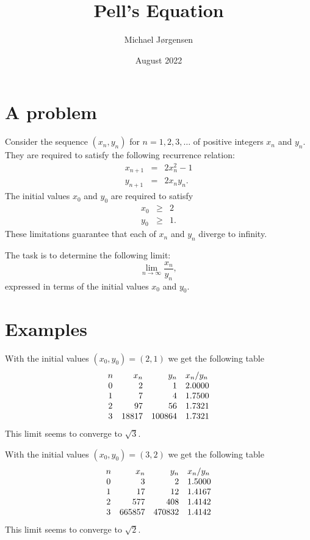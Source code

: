 \documentclass[12pt,oneside,a4paper]{article}
\title{Pell's Equation}
\date{August 2022}
\author{Michael Jørgensen}
\begin{document}
\maketitle

\section{A problem}

Consider the sequence $(x_n, y_n)$ for $n=1, 2, 3, \ldots$ of positive integers $x_n$ and $y_n$.
They are required to satisfy the following recurrence relation:
%
\begin{eqnarray*}
    x_{n+1} &=& 2 x_n^2 - 1 \\
    y_{n+1} &=& 2 x_n y_n.
\end{eqnarray*}
%
The initial values $x_0$ and $y_0$ are required to satisfy
%
\begin{eqnarray*}
    x_0 &\ge& 2 \\
    y_0 &\ge& 1.
\end{eqnarray*}
%
These limitations guarantee that each of $x_n$ and $y_n$ diverge to infinity.

The task is to determine the following limit:
%
\begin{equation*}
    \lim_{n \rightarrow \infty} \frac{x_n}{y_n},
\end{equation*}
%
expressed in terms of the initial values $x_0$ and $y_0$.

\section{Examples}

With the initial values $(x_0, y_0) = (2, 1)$ we get the following table
%
\begin{equation*}
\begin{array}{c r r l}
    n &   x_n &    y_n & x_n/y_n \\
    0 &     2 &      1 & 2.0000 \\
    1 &     7 &      4 & 1.7500 \\
    2 &    97 &     56 & 1.7321 \\
    3 & 18817 & 100864 & 1.7321
\end{array}
\end{equation*}
%
This limit seems to converge to $\sqrt{3}$.

With the initial values $(x_0, y_0) = (3, 2)$ we get the following table
%
\begin{equation*}
\begin{array}{c r r l}
    n &    x_n &    y_n & x_n/y_n \\
    0 &      3 &      2 & 1.5000 \\
    1 &     17 &     12 & 1.4167 \\
    2 &    577 &    408 & 1.4142 \\
    3 & 665857 & 470832 & 1.4142
\end{array}
\end{equation*}
%
This limit seems to converge to $\sqrt{2}$.
\end{document}
